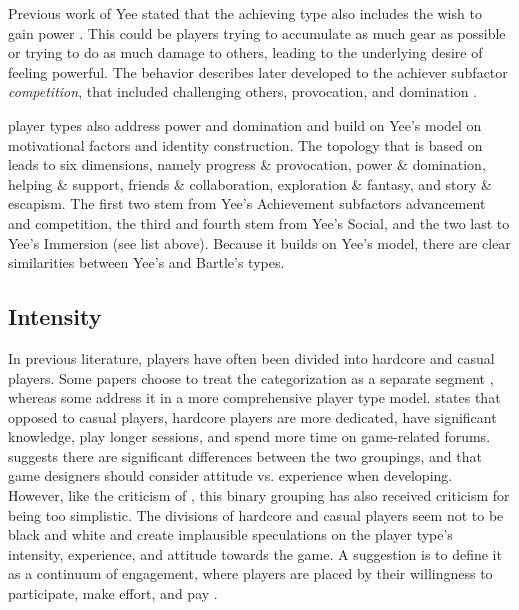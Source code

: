 \documentclass[../Main.tex]{subfiles}
\begin{document}
Previous work of Yee stated that the achieving type also includes the wish to gain power \citep{yee_facets_2002}. This could be players trying to accumulate as much gear as possible or trying to do as much damage to others, leading to the underlying desire of feeling powerful. The behavior \citet{yee_facets_2002} describes later developed to the achiever subfactor \textit{competition}, that included challenging others, provocation, and domination \citep{yee_motivations_2007}. 

\citet{zackariasson_virtual_2010} player types also address power and domination and build on Yee’s model on motivational factors and identity construction. The topology that \citet{zackariasson_virtual_2010} is based on leads to six dimensions, namely progress \& provocation, power \& domination, helping \& support, friends \& collaboration, exploration \& fantasy, and story \& escapism. The first two stem from Yee’s Achievement subfactors advancement and competition, the third and fourth stem from Yee’s Social, and the two last to Yee’s Immersion (see list above). Because it builds on Yee’s model, there are clear similarities between Yee’s and Bartle’s types.



\subsection{Intensity}
In previous literature, players have often been divided into hardcore and casual players. Some papers choose to treat the categorization as a separate segment \citep{ip_segmentation_2005}, whereas some address it in a more comprehensive player type model. \citeauthor{hamari_player_2014} states that opposed to casual players, hardcore players are more dedicated, have significant knowledge, play longer sessions, and spend more time on game-related forums. \citet{ip_segmentation_2005} suggests there are significant differences between the two groupings, and that game designers should consider attitude vs. experience when developing. However, like the criticism of \citet{bartle_hearts_1996}, this binary grouping has also received criticism for being too simplistic. The divisions of hardcore and casual players seem not to be black and white and create implausible speculations on the player type’s intensity, experience, and attitude towards the game. A suggestion is to define it as a continuum of engagement, where players are placed by their willingness to participate, make effort, and pay \citep{hamari_player_2014}.
\end{document}
